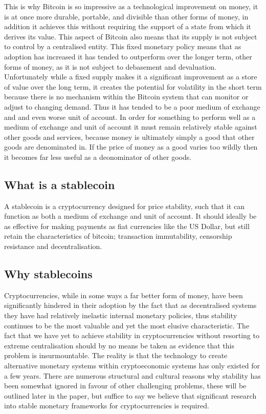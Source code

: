 \documentclass{article}
\begin{document}
This is why Bitcoin is so impressive as a technological improvement on money, it is at once more durable, portable, and divisible than other forms of money, in addition it achieves this without requiring the support of a state from which it derives its value. This aspect of Bitcoin also means that its supply is not subject to control by a centralised entity. This fixed monetary policy means that as adoption has increased it has tended to outperform over the longer term, other forms of money, as it is not subject to debasement and devaluation. Unfortunately while a fixed supply makes it a significant improvement as a store of value over the long term, it creates the potential for volatility in the short term because there is no mechanism within the Bitcoin system that can monitor or adjust to changing demand. Thus it has tended to be a poor medium of exchange and and even worse unit of account. In order for something to perform well as a medium of exchange and unit of account it must remain relatively stable against other goods and services, because money is ultimately simply a good that other goods are denominated in. If the price of money as a good varies too wildly then it becomes far less useful as a deonominator of other goods. \\

\subsection{What is a stablecoin}

\noindent A stablecoin is a cryptocurrency designed for price stability, such that it can function as both a medium of exchange and unit of account. It should ideally be as effective for making payments as fiat currencies like the US Dollar, but still retain the characteristics of bitcoin; transaction immutability, censorship resistance and decentralisation. \\

\subsection{Why stablecoins}

\noindent Cryptocurrencies, while in some ways a far better form of money, have been significantly hindered in their adoption by the fact that as decentralised systems they have had relatively inelastic internal monetary policies, thus stability continues to be the most valuable and yet the most elusive characteristic. The fact that we have yet to achieve stability in cryptocurrencies without resorting to extreme centralisation should by no means be taken as evidence that this problem is insurmountable. The reality is that the technology to create alternative monetary systems within cryptoeconomic systems has only existed for a few years. There are numerous structural and cultural reasons why stability has been somewhat ignored in favour of other challenging problems, these will be outlined later in the paper, but suffice to say we believe that significant research into stable monetary frameworks for cryptocurrencies is required. \\
\end{document}
